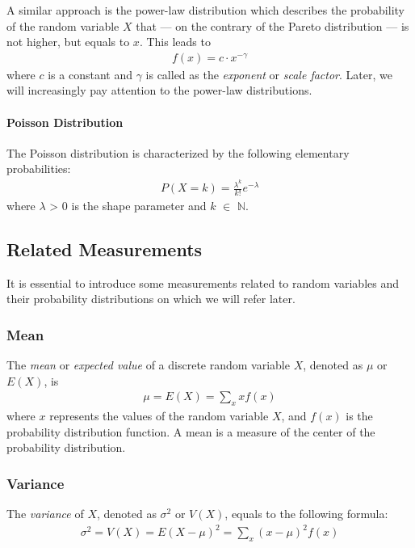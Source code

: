A similar approach is the power-law distribution which describes the probability of the random variable $X$ that --- on the contrary of the Pareto distribution --- is not higher, but equals to $x$. This leads to
\begin{align}
	f(x) = c\cdot x^{-\gamma}
\end{align}
where $c$ is a constant and $\gamma$ is called as the \textit{exponent} or \textit{scale factor}. Later, we will increasingly pay attention to the power-law distributions.

\paragraph{Poisson Distribution}
The Poisson distribution is characterized by the following elementary probabilities:
\begin{align}
	P(X = k) = \frac{\lambda^k}{k!}e^{-\lambda}
\end{align}
where $\lambda$ > 0 is the shape parameter and $k$ $\in$ $\mathbb{N}$.


\subsection{Related Measurements}

It is essential to introduce some measurements related to random variables and their probability distributions on which we will refer later.
\subsubsection{Mean}
The \textit{mean} or \textit{expected value} of a discrete random variable $X$, denoted as $\mu$ or $E(X)$, is
\begin{align}
	\mu = E(X) = \sum_{x} xf(x)
\end{align}
where $x$ represents the values of the random variable $X$, and $f(x)$ is the probability distribution function. A mean is a measure of the center of the probability distribution.

\subsubsection{Variance}

The \textit{variance} of $X$, denoted as $\sigma^2$ or $V(X)$, equals to the following formula:
\begin{align}
	\sigma^2 = V(X) = E(X - \mu)^2 = \sum_{x}(x - \mu)^2 f(x)
\end{align}

